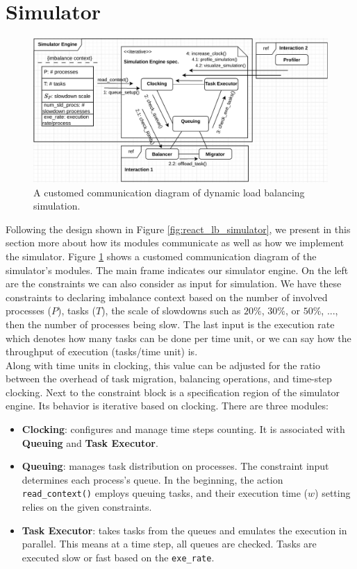 \section{Simulator}
\label{sec:PoC-Simulator}

\begin{figure}[t]
  \centering
  \includegraphics[scale=0.7]{./pictures/poc_implementation/poc_simulator_comm_diagram.pdf}
	\caption{A customed communication diagram of dynamic load balancing simulation.}
	\label{fig:simulator_comm_diagram}
\end{figure}

Following the design shown in Figure \ref{fig:react_lb_simulator}, we present in this section more about how its modules communicate as well as how we implement the simulator. Figure \ref{fig:simulator_comm_diagram} shows a customed communication diagram of the simulator's modules. The main frame indicates our simulator engine. On the left are the constraints we can also consider as input for simulation. We have these constraints to declaring imbalance context based on the number of involved processes ($P$), tasks ($T$), the scale of slowdowns such as $20\%$, $30\%$, or $50\%$, ..., then the number of processes being slow. The last input is the execution rate which denotes how many tasks can be done per time unit, or we can say how the throughput of execution (tasks/time unit) is.\\

Along with time units in clocking, this value can be adjusted for the ratio between the overhead of task migration, balancing operations, and time-step clocking. Next to the constraint block is a specification region of the simulator engine. Its behavior is iterative based on clocking. There are three modules:
\begin{itemize}
	\item \textbf{Clocking}: configures and manage time steps counting. It is associated with \textbf{Queuing} and \textbf{Task Executor}.
	\item \textbf{Queuing}: manages task distribution on processes. The constraint input determines each process's queue. In the beginning, the action \texttt{read\_context()} employs queuing tasks, and their execution time ($w$) setting relies on the given constraints.
	\item \textbf{Task Executor}: takes tasks from the queues and emulates the execution in parallel. This means at a time step, all queues are checked. Tasks are executed slow or fast based on the \texttt{exe\_rate}.
\end{itemize}

